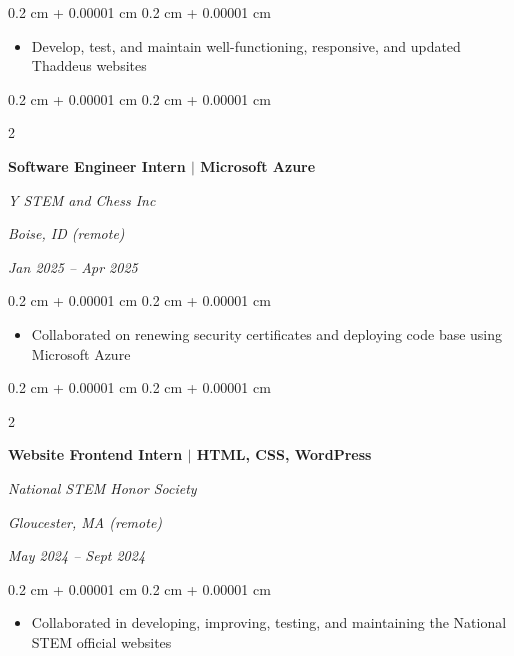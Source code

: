 \documentclass[10pt, letterpaper]{article}
\newenvironment{highlights}{
    \begin{itemize}[
        topsep=0.10 cm,
        parsep=0.10 cm,
        partopsep=0pt,
        itemsep=0pt,
        leftmargin=0.4 cm + 10pt
    ]
}{
    \end{itemize}
} %
\newenvironment{onecolentry}{
    \begin{adjustwidth}{
        0.2 cm + 0.00001 cm
    }{
        0.2 cm + 0.00001 cm
    }
}{
    \end{adjustwidth}
} %
\newenvironment{twocolentry}[2][]{
    \onecolentry
    \def\secondColumn{#2}
    \setcolumnwidth{\fill, 4.5 cm}
    \begin{paracol}{2}
}{
    \switchcolumn \raggedleft \secondColumn
    \end{paracol}
    \endonecolentry
} %
\begin{document}
        \vspace{0.10 cm}
        \begin{onecolentry}
            \begin{highlights}
                \item Develop, test, and maintain well-functioning, responsive, and updated Thaddeus websites
            \end{highlights}
        \end{onecolentry}
        \vspace{0.1 cm}
        \begin{twocolentry}{
        \textit{Boise, ID (remote)}    
            
        \textit{Jan 2025 – Apr 2025}}
            \textbf{Software Engineer Intern \(|\) Microsoft Azure}
            
            \textit{Y STEM and Chess Inc}
        \end{twocolentry}

        \vspace{0.10 cm}
        \begin{onecolentry}
            \begin{highlights}
                \item Collaborated on renewing security certificates and deploying code base using Microsoft Azure
            \end{highlights}
        \end{onecolentry}
        \vspace{0.1 cm}
        \begin{twocolentry}{
        \textit{Gloucester, MA (remote)}    
            
        \textit{May 2024 – Sept 2024}}
            \textbf{Website Frontend Intern \(|\) HTML, CSS, WordPress}
            
            \textit{National STEM Honor Society}
        \end{twocolentry}

        \vspace{0.10 cm}
        \begin{onecolentry}
            \begin{highlights}
                \item Collaborated in developing, improving, testing, and maintaining the National STEM official websites
            \end{highlights}
        \end{onecolentry}
\end{document}
